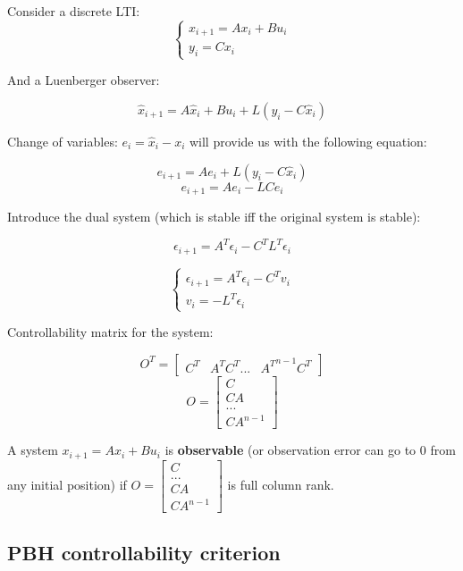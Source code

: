 Consider a discrete LTI:
\[
\begin{cases}
    x_{i+1} = Ax_i + Bu_i \\
    y_i = Cx_i
\end{cases}
\]

And a Luenberger observer:

\[
\hat{x}_{i+1} = A\hat{x}_i + Bu_i + L(y_i - C \hat{x}_i)
\]

Change of variables: $e_i = \hat{x}_i - x_i$ will provide us with the following equation:

\[
e_{i+1} = Ae_i + L(y_i - C \hat{x}_i)
\]
\[
e_{i+1} = Ae_i - LCe_i
\]

Introduce the dual system (which is stable iff the original system is stable):

\[
\epsilon_{i+1} = A^T\epsilon_i - C^T L^T\epsilon_i
\]

\[
\begin{cases}
    \epsilon_{i+1} = A^T \epsilon_i - C^T v_i \\
    v_i = - L^T \epsilon_i
\end{cases}
\]

Controllability matrix for the system:

\[O^T = \begin{bmatrix} C^T & A^T C^T ... & {A^T}^{n-1} C^T \end{bmatrix}\]
\[O = \begin{bmatrix} C \\ CA \\ ... \\ CA^{n-1} \end{bmatrix} \]



\begin{tcolorbox}[colback=green!10,colframe=green!50!black,title=\textbf{Observability}]
    A system $x_{i+1} = Ax_i + Bu_i$ is \textbf{observable} (or observation error can go to 0 from any initial position) if $O = \begin{bmatrix} C \\ ... \\CA \\ CA^{n-1} \end{bmatrix}$
    is full column rank.
\end{tcolorbox}


\subsection{PBH controllability criterion}

